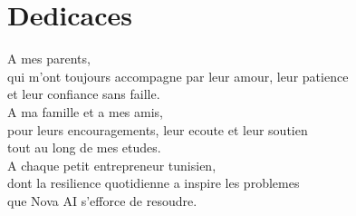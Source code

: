 \thispagestyle{empty}
\chapter*{Dedicaces}
\vspace{1cm}
\begin{flushright}\itshape\large

A mes parents,\\
qui m'ont toujours accompagne par leur amour, leur patience\\
et leur confiance sans faille.\\[1cm]

A ma famille et a mes amis,\\
pour leurs encouragements, leur ecoute et leur soutien\\
tout au long de mes etudes.\\[1cm]

A chaque petit entrepreneur tunisien,\\
dont la resilience quotidienne a inspire les problemes\\
que Nova AI s'efforce de resoudre.\\[1cm]

\end{flushright}
\vspace*{\fill}
\newpage
